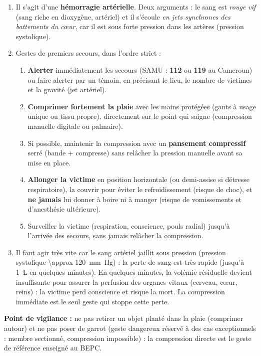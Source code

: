 \documentclass[11pt]{article}
\begin{document}
\begin{corrige}
\begin{enumerate}
\item Il s'agit d'une \textbf{hémorragie artérielle}. Deux arguments : le sang est \emph{rouge vif} (sang riche en dioxygène, artériel) et il s'écoule \emph{en jets synchrones des battements du cœur}, car il est sous forte pression dans les artères (pression systolique).
\item Gestes de premiers secours, dans l'ordre strict :
\begin{enumerate}
\item \textbf{Alerter} immédiatement les secours (SAMU : \textbf{112} ou \textbf{119} au Cameroun) ou faire alerter par un témoin, en précisant le lieu, le nombre de victimes et la gravité (jet artériel).
\item \textbf{Comprimer fortement la plaie} avec les mains protégées (gants à usage unique ou tissu propre), directement sur le point qui saigne (compression manuelle digitale ou palmaire).
\item Si possible, maintenir la compression avec un \textbf{pansement compressif} serré (bande + compresse) sans relâcher la pression manuelle avant sa mise en place.
\item \textbf{Allonger la victime} en position horizontale (ou demi-assise si détresse respiratoire), la couvrir pour éviter le refroidissement (risque de choc), et \textbf{ne jamais} lui donner à boire ni à manger (risque de vomissements et d'anesthésie ultérieure).
\item Surveiller la victime (respiration, conscience, pouls radial) jusqu'à l'arrivée des secours, sans jamais relâcher la compression.
\end{enumerate}
\item Il faut agir très vite car le sang artériel jaillit sous pression (pression systolique \SI{\approx 120}{\milli\meter Hg}) : la perte de sang est très rapide (jusqu'à \SI{1}{\liter} en quelques minutes). En quelques minutes, la volémie résiduelle devient insuffisante pour assurer la perfusion des organes vitaux (cerveau, cœur, reins) : la victime perd conscience et risque la mort. La compression immédiate est le seul geste qui stoppe cette perte.
\end{enumerate}
\textbf{Point de vigilance :} ne pas retirer un objet planté dans la plaie (comprimer autour) et ne pas poser de garrot (geste dangereux réservé à des cas exceptionnels : membre sectionné, compression impossible) : la compression directe est le geste de référence enseigné au BEPC.
\end{corrige}
\end{document}
